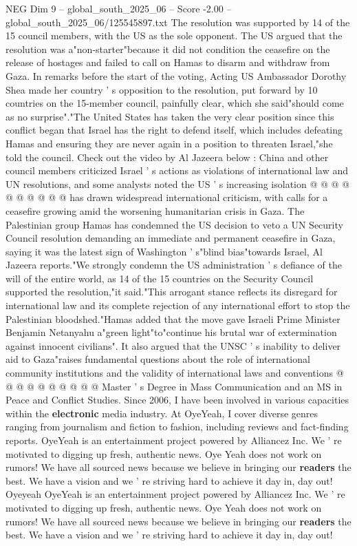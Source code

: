 \begin{textsample}{NEG Dim 9 – global\_south\_2025\_06 – Score -2.00 – global\_south\_2025\_06/125545897.txt}  \label{ex:f9_neg_280}
The resolution was supported by 14 of the 15 council members, with the US as the sole opponent.
The US argued that the resolution was a"non-starter"because it did not condition the ceasefire on the release of hostages and failed to call on Hamas to disarm and withdraw from Gaza.
In remarks before the start of the voting, Acting US Ambassador Dorothy Shea made her country ' s opposition to the resolution, put forward by 10 countries on the 15-member council, painfully clear, which she said"should come as no surprise"."The United States has taken the very clear position since this conflict began that Israel has the right to defend itself, which includes defeating Hamas and ensuring they are never again in a position to threaten Israel,"she told the council.
Check out the video by Al Jazeera below : China and other council members criticized Israel ' s actions as violations of international law and UN resolutions, and some analysts noted the US ' s increasing isolation @ @ @ @ @ @ @ @ @ @ has drawn widespread international criticism, with calls for a ceasefire growing amid the worsening humanitarian crisis in Gaza.
The Palestinian group Hamas has condemned the US decision to veto a UN Security Council resolution demanding an immediate and permanent ceasefire in Gaza, saying it was the latest sign of Washington ' s"blind bias"towards Israel, Al Jazeera reports."We strongly condemn the US administration ' s defiance of the will of the entire world, as 14 of the 15 countries on the Security Council supported the resolution,"it said."This arrogant stance reflects its disregard for international law and its complete rejection of any international effort to stop the Palestinian bloodshed."Hamas added that the move gave Israeli Prime Minister Benjamin Netanyahu a"green light"to"continue his brutal war of extermination against innocent civilians".
It also argued that the UNSC ' s inability to deliver aid to Gaza"raises fundamental questions about the role of international community institutions and the validity of international laws and conventions @ @ @ @ @ @ @ @ @ @ Master ' s Degree in Mass Communication and an MS in Peace and Conflict Studies.
Since 2006, I have been involved in various capacities within the \textbf{electronic} media industry.
At OyeYeah, I cover diverse genres ranging from journalism and fiction to fashion, including reviews and fact-finding reports.
OyeYeah is an entertainment project powered by Alliancez Inc.
We ' re motivated to digging up fresh, authentic news.
Oye Yeah does not work on rumors!
We have all sourced news because we believe in bringing our \textbf{readers} the best.
We have a vision and we ' re striving hard to achieve it day in, day out!
Oyeyeah OyeYeah is an entertainment project powered by Alliancez Inc.
We ' re motivated to digging up fresh, authentic news.
Oye Yeah does not work on rumors!
We have all sourced news because we believe in bringing our \textbf{readers} the best.
We have a vision and we ' re striving hard to achieve it day in, day out!

\end{textsample}
